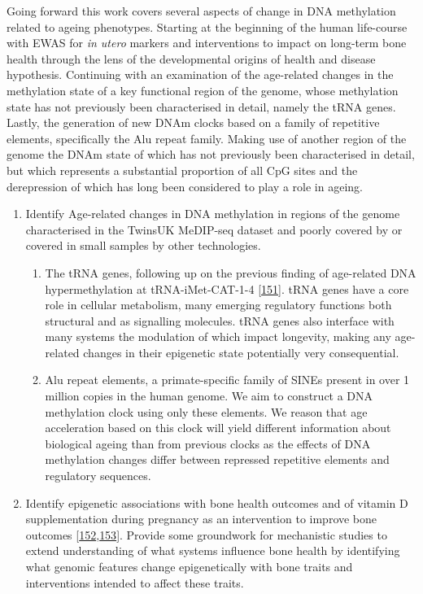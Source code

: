\documentclass[
]{book}
\providecommand{\tightlist}{%
  \setlength{\itemsep}{0pt}\setlength{\parskip}{0pt}}
\begin{document}
Going forward this work covers several aspects of change in DNA methylation related to ageing phenotypes.
Starting at the beginning of the human life-course with EWAS for \emph{in utero} markers and interventions to impact on long-term bone health through the lens of the developmental origins of health and disease hypothesis.
Continuing with an examination of the age-related changes in the methylation state of a key functional region of the genome, whose methylation state has not previously been characterised in detail, namely the tRNA genes.
Lastly, the generation of new DNAm clocks based on a family of repetitive elements, specifically the Alu repeat family. Making use of another region of the genome the DNAm state of which has not previously been characterised in detail, but which represents a substantial proportion of all CpG sites and the derepression of which has long been considered to play a role in ageing.

\begin{enumerate}
\def\labelenumi{\arabic{enumi}.}
\item
  Identify Age-related changes in DNA methylation in regions of the genome characterised in the TwinsUK MeDIP-seq dataset and poorly covered by or covered in small samples by other technologies.

  \begin{enumerate}
  \def\labelenumii{\alph{enumii}.}
  \tightlist
  \item
    The tRNA genes, following up on the previous finding of age-related DNA hypermethylation at tRNA-iMet-CAT-1-4 {[}\protect\hyperlink{ref-Bell2016}{151}{]}. tRNA genes have a core role in cellular metabolism, many emerging regulatory functions both structural and as signalling molecules. tRNA genes also interface with many systems the modulation of which impact longevity, making any age-related changes in their epigenetic state potentially very consequential.
  \item
    Alu repeat elements, a primate-specific family of SINEs present in over 1 million copies in the human genome. We aim to construct a DNA methylation clock using only these elements. We reason that age acceleration based on this clock will yield different information about biological ageing than from previous clocks as the effects of DNA methylation changes differ between repressed repetitive elements and regulatory sequences.
  \end{enumerate}
\item
  Identify epigenetic associations with bone health outcomes and of vitamin D supplementation during pregnancy as an intervention to improve bone outcomes {[}\protect\hyperlink{ref-Harvey2012a}{152},\protect\hyperlink{ref-Cooper2016}{153}{]}. Provide some groundwork for mechanistic studies to extend understanding of what systems influence bone health by identifying what genomic features change epigenetically with bone traits and interventions intended to affect these traits.
\end{enumerate}
\end{document}
